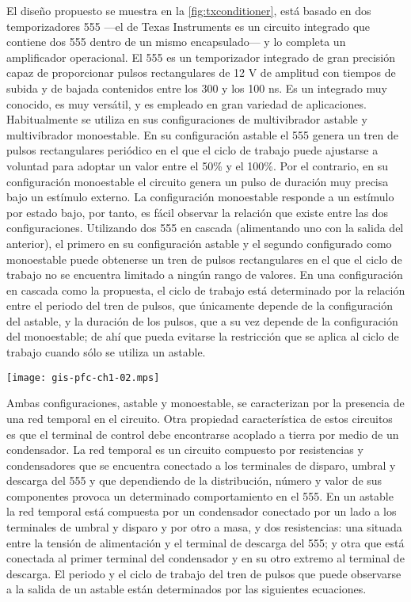 El diseño propuesto se muestra en la \cref{fig:txconditioner}, está basado
en dos temporizadores 555 ---el  de Texas Instruments es un
circuito integrado que contiene dos 555 dentro de un mismo encapsulado--- y
lo completa un amplificador operacional. El 555 es un temporizador
integrado de gran precisión capaz de proporcionar pulsos rectangulares de
12 V de amplitud con tiempos de subida y de bajada contenidos entre los 300
y los 100 ns. Es un integrado muy conocido, es muy versátil, y es empleado
en gran variedad de aplicaciones. Habitualmente se utiliza en sus
configuraciones de multivibrador astable y multivibrador monoestable. En su
configuración astable el 555 genera un tren de pulsos rectangulares
periódico en el que el ciclo de trabajo puede ajustarse a voluntad para
adoptar un valor entre el 50\% y el 100\%. Por el contrario, en su
configuración monoestable el circuito genera un pulso de duración muy
precisa bajo un estímulo externo. La configuración monoestable responde a
un estímulo por estado bajo, por tanto, es fácil observar la relación que
existe entre las dos configuraciones. Utilizando dos 555 en cascada
(alimentando uno con la salida del anterior), el primero en su
configuración astable y el segundo configurado como monoestable puede
obtenerse un tren de pulsos rectangulares en el que el ciclo de trabajo no
se encuentra limitado a ningún rango de valores. En una configuración en
cascada como la propuesta, el ciclo de trabajo está determinado por la
relación entre el periodo del tren de pulsos, que únicamente depende de la
configuración del astable, y la duración de los pulsos, que a su vez
depende de la configuración del monoestable; de ahí que pueda evitarse la
restricción que se aplica al ciclo de trabajo cuando sólo se utiliza un
astable.

\begin{sidewaysfigure}
	\begin{center}
		\texttt{[image: gis-pfc-ch1-02.mps]}
	\end{center}
	\caption[Circuito acondicionador de la sección de emisión]{Circuito
	propuesto para acondicionar el actuador de ultrasonidos.}
	\label{fig:txconditioner}
\end{sidewaysfigure}

Ambas configuraciones, astable y monoestable, se caracterizan por la
presencia de una red temporal en el circuito. Otra propiedad característica
de estos circuitos es que el terminal de control debe encontrarse acoplado
a tierra por medio de un condensador. La red temporal es un circuito
compuesto por resistencias y condensadores que se encuentra conectado a los
terminales de disparo, umbral y descarga del 555 y que dependiendo de la
distribución, número y valor de sus componentes provoca un determinado
comportamiento en el 555. En un astable la red temporal está compuesta por
un condensador conectado por un lado a los terminales de umbral y disparo y
por otro a masa, y dos resistencias: una situada entre la tensión de
alimentación y el terminal de descarga del 555; y otra que está conectada
al primer terminal del condensador y en su otro extremo al terminal de
descarga. El periodo y el ciclo de trabajo del tren de pulsos que puede
observarse a la salida de un astable están determinados por las siguientes
ecuaciones.

